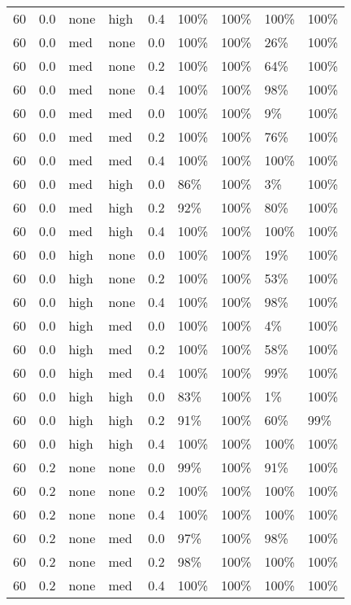 \begin{longtable}{rrllrllll}
  60 & 0.0 & none & high & 0.4 & 100\% & 100\% & 100\% & 100\% \\ 
  60 & 0.0 & med & none & 0.0 & 100\% & 100\% & 26\% & 100\% \\ 
  60 & 0.0 & med & none & 0.2 & 100\% & 100\% & 64\% & 100\% \\ 
  60 & 0.0 & med & none & 0.4 & 100\% & 100\% & 98\% & 100\% \\ 
  60 & 0.0 & med & med & 0.0 & 100\% & 100\% & 9\% & 100\% \\ 
  60 & 0.0 & med & med & 0.2 & 100\% & 100\% & 76\% & 100\% \\ 
  60 & 0.0 & med & med & 0.4 & 100\% & 100\% & 100\% & 100\% \\ 
  60 & 0.0 & med & high & 0.0 & 86\% & 100\% & 3\% & 100\% \\ 
  60 & 0.0 & med & high & 0.2 & 92\% & 100\% & 80\% & 100\% \\ 
  60 & 0.0 & med & high & 0.4 & 100\% & 100\% & 100\% & 100\% \\ 
  60 & 0.0 & high & none & 0.0 & 100\% & 100\% & 19\% & 100\% \\ 
  60 & 0.0 & high & none & 0.2 & 100\% & 100\% & 53\% & 100\% \\ 
  60 & 0.0 & high & none & 0.4 & 100\% & 100\% & 98\% & 100\% \\ 
  60 & 0.0 & high & med & 0.0 & 100\% & 100\% & 4\% & 100\% \\ 
  60 & 0.0 & high & med & 0.2 & 100\% & 100\% & 58\% & 100\% \\ 
  60 & 0.0 & high & med & 0.4 & 100\% & 100\% & 99\% & 100\% \\ 
  60 & 0.0 & high & high & 0.0 & 83\% & 100\% & 1\% & 100\% \\ 
  60 & 0.0 & high & high & 0.2 & 91\% & 100\% & 60\% & 99\% \\ 
  60 & 0.0 & high & high & 0.4 & 100\% & 100\% & 100\% & 100\% \\ 
  60 & 0.2 & none & none & 0.0 & 99\% & 100\% & 91\% & 100\% \\ 
  60 & 0.2 & none & none & 0.2 & 100\% & 100\% & 100\% & 100\% \\ 
  60 & 0.2 & none & none & 0.4 & 100\% & 100\% & 100\% & 100\% \\ 
  60 & 0.2 & none & med & 0.0 & 97\% & 100\% & 98\% & 100\% \\ 
  60 & 0.2 & none & med & 0.2 & 98\% & 100\% & 100\% & 100\% \\ 
  60 & 0.2 & none & med & 0.4 & 100\% & 100\% & 100\% & 100\% \\ 

\end{longtable}
